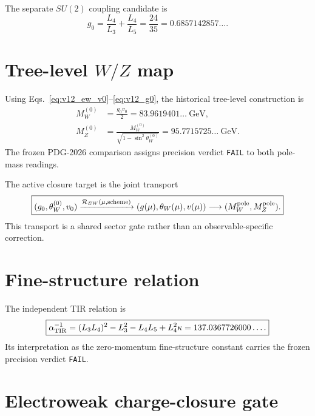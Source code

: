 The separate $SU(2)$ coupling candidate is
\begin{equation}
\boxed{
g_0=\frac{L_4}{L_3}+\frac{L_4}{L_5}
=\frac{24}{35}
=0.6857142857\ldots .
}
\label{eq:v12_g0}
\end{equation}

\section[Tree-level W/Z map]{Tree-level $W/Z$ map}

Using Eqs.~\eqref{eq:v12_ew_v0}--\eqref{eq:v12_g0}, the historical tree-level construction is
\begin{align}
M_W^{(0)}&=\frac{g_0v_0}{2}
=83.9619401\ldots\ \mathrm{GeV},\\
M_Z^{(0)}&=\frac{M_W^{(0)}}{\sqrt{1-\sin^2\theta_W^{(0)}}}
=95.7715725\ldots\ \mathrm{GeV}.
\end{align}
The frozen PDG-2026 comparison assigns precision verdict \texttt{FAIL} to both pole-mass readings.

The active closure target is the joint transport
\begin{equation}
\boxed{
(g_0,\theta_W^{(0)},v_0)
\xrightarrow{\mathcal R_{EW}(\mu,\mathrm{scheme})}
(g(\mu),\theta_W(\mu),v(\mu))
\longrightarrow
(M_W^{\rm pole},M_Z^{\rm pole}).
}
\label{eq:v12_rew}
\end{equation}
This transport is a shared sector gate rather than an observable-specific correction.

\section{Fine-structure relation}

The independent TIR relation is
\begin{equation}
\boxed{
\alpha_{\rm TIR}^{-1}
=(L_3L_4)^2-L_3^2-L_4L_5+L_4^2\kappa
=137.0367726000\ldots .
}
\label{eq:v12_alpha_inv}
\end{equation}
Its interpretation as the zero-momentum fine-structure constant carries the frozen precision verdict \texttt{FAIL}.

\section{Electroweak charge-closure gate}

